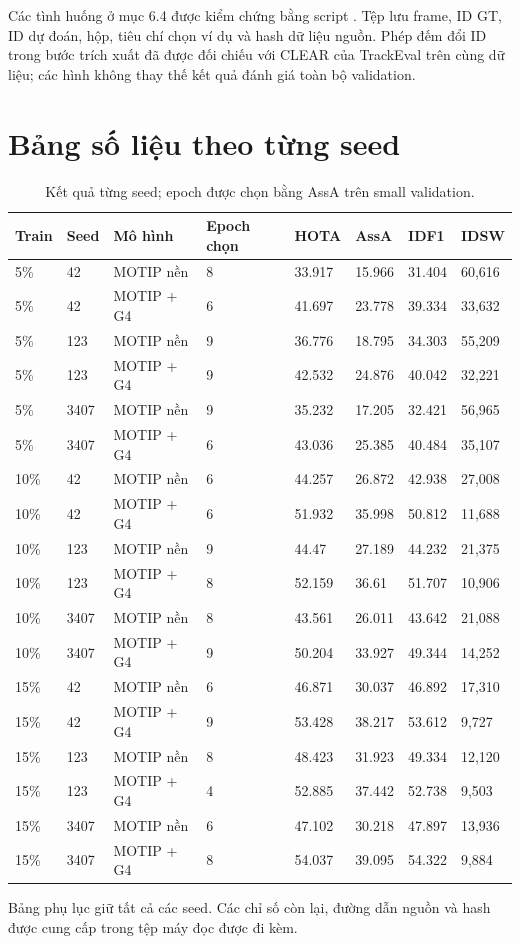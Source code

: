 Các tình huống ở mục 6.4 được kiểm chứng bằng script . Tệp  lưu frame, ID GT, ID dự đoán, hộp, tiêu chí chọn ví dụ và hash dữ liệu nguồn. Phép đếm đổi ID trong bước trích xuất đã được đối chiếu với CLEAR của TrackEval trên cùng dữ liệu; các hình không thay thế kết quả đánh giá toàn bộ validation.

\FloatBarrier
\section{Bảng số liệu theo từng seed}
\begin{table}[!htbp]
\centering
\caption{Kết quả từng seed; epoch được chọn bằng AssA trên small validation.}\label{tab:7}

\small\setlength{\tabcolsep}{4.2pt}
\begin{tabular}{llllllll}
\toprule
\textbf{Train} & \textbf{Seed} & \textbf{Mô hình} & \textbf{Epoch chọn} & \textbf{HOTA} & \textbf{AssA} & \textbf{IDF1} & \textbf{IDSW} \\
\midrule
5\% & 42 & MOTIP nền & 8 & 33.917 & 15.966 & 31.404 & 60,616 \\
5\% & 42 & MOTIP + G4 & 6 & 41.697 & 23.778 & 39.334 & 33,632 \\
5\% & 123 & MOTIP nền & 9 & 36.776 & 18.795 & 34.303 & 55,209 \\
5\% & 123 & MOTIP + G4 & 9 & 42.532 & 24.876 & 40.042 & 32,221 \\
5\% & 3407 & MOTIP nền & 9 & 35.232 & 17.205 & 32.421 & 56,965 \\
5\% & 3407 & MOTIP + G4 & 6 & 43.036 & 25.385 & 40.484 & 35,107 \\
10\% & 42 & MOTIP nền & 6 & 44.257 & 26.872 & 42.938 & 27,008 \\
10\% & 42 & MOTIP + G4 & 6 & 51.932 & 35.998 & 50.812 & 11,688 \\
10\% & 123 & MOTIP nền & 9 & 44.47 & 27.189 & 44.232 & 21,375 \\
10\% & 123 & MOTIP + G4 & 8 & 52.159 & 36.61 & 51.707 & 10,906 \\
10\% & 3407 & MOTIP nền & 8 & 43.561 & 26.011 & 43.642 & 21,088 \\
10\% & 3407 & MOTIP + G4 & 9 & 50.204 & 33.927 & 49.344 & 14,252 \\
15\% & 42 & MOTIP nền & 6 & 46.871 & 30.037 & 46.892 & 17,310 \\
15\% & 42 & MOTIP + G4 & 9 & 53.428 & 38.217 & 53.612 & 9,727 \\
15\% & 123 & MOTIP nền & 8 & 48.423 & 31.923 & 49.334 & 12,120 \\
15\% & 123 & MOTIP + G4 & 4 & 52.885 & 37.442 & 52.738 & 9,503 \\
15\% & 3407 & MOTIP nền & 6 & 47.102 & 30.218 & 47.897 & 13,936 \\
15\% & 3407 & MOTIP + G4 & 8 & 54.037 & 39.095 & 54.322 & 9,884 \\
\bottomrule
\end{tabular}
\end{table}

Bảng phụ lục giữ tất cả các seed. Các chỉ số còn lại, đường dẫn nguồn và hash được cung cấp trong tệp máy đọc được đi kèm.

